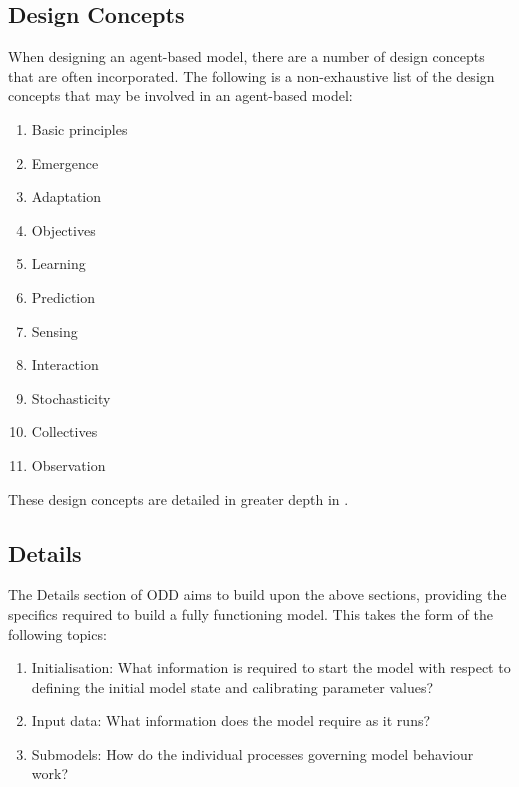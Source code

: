 \subsection{Design Concepts}
\label{sub:odd:design_concepts}

When designing an agent-based model, there are a number of design concepts that
are often incorporated.
The following is a non-exhaustive list of the design concepts that may be
involved in an agent-based model:
\begin{enumerate}
    \item Basic principles
    \item Emergence
    \item Adaptation
    \item Objectives
    \item Learning
    \item Prediction
    \item Sensing
    \item Interaction
    \item Stochasticity
    \item Collectives
    \item Observation
\end{enumerate}
These design concepts are detailed in greater depth in \cite{grimm2010odd}.

\subsection{Details}
\label{sub:odd:details}

The Details section of ODD aims to build upon the above sections, providing the
specifics required to build a fully functioning model.
This takes the form of the following topics:
\begin{enumerate}
    \item Initialisation: What information is required to start the model with
        respect to defining the initial model state and calibrating parameter
        values?
    \item Input data: What information does the model require as it runs?
    \item Submodels: How do the individual processes governing model behaviour
        work?
\end{enumerate}

